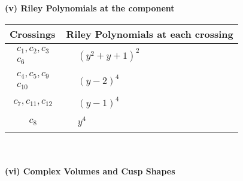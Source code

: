 \documentclass[1p]{elsarticle_modified}
\theoremstyle{definition}
\begin{document}
\newpage\renewcommand{\arraystretch}{1}
\flushleft \textbf{(v) Riley Polynomials at the component}\newline \\
\begin{tabular}{m{50pt}|m{274pt}}
Crossings & \hspace{64pt}Riley Polynomials at each crossing \\
\hline $$\begin{aligned}c_{1},c_{2},c_{3}\\c_{6}\end{aligned}$$&$\begin{aligned}
&(y^2+y+1)^2
\end{aligned}$\\
\hline $$\begin{aligned}c_{4},c_{5},c_{9}\\c_{10}\end{aligned}$$&$\begin{aligned}
&(y-2)^4
\end{aligned}$\\
\hline $$\begin{aligned}c_{7},c_{11},c_{12}\end{aligned}$$&$\begin{aligned}
&(y-1)^4
\end{aligned}$\\
\hline $$\begin{aligned}c_{8}\end{aligned}$$&$\begin{aligned}
&y^4
\end{aligned}$\\
\hline
\end{tabular}\\~\\
\newpage\flushleft \textbf{(vi) Complex Volumes and Cusp Shapes}
\end{document}

